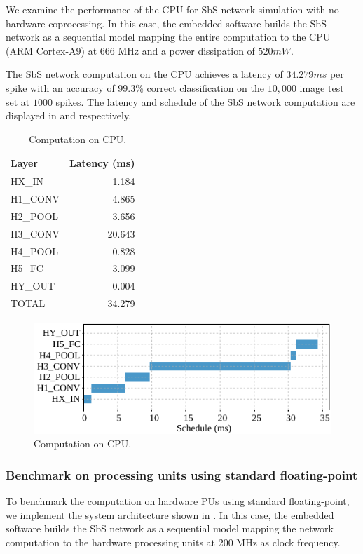 We examine the performance of the CPU for SbS network simulation with no hardware coprocessing. In this case, the embedded software builds the SbS network as a sequential model mapping the entire computation to the CPU (ARM Cortex-A9) at 666 MHz and a power dissipation of $520 mW$.

The SbS network computation on the CPU achieves a latency of $34.279 ms$ per spike with an accuracy of 99.3\% correct classification on the $10,000$ image test set at $1000$ spikes. The latency and schedule of the SbS network computation are displayed in  and  respectively.

\begin{table}[!t]\centering
	\caption{Computation on CPU.}\label{tab:latency_sw}
	\scriptsize
\begin{tabular}{lrr}\toprule
	\textbf{Layer} &\textbf{Latency (ms)} \\\midrule
	HX\_IN &1.184 \\
	H1\_CONV &4.865 \\
	H2\_POOL &3.656 \\
	H3\_CONV &20.643 \\
	H4\_POOL &0.828 \\
	H5\_FC &3.099 \\
	HY\_OUT &0.004 \\
		
	TOTAL &34.279 \\
	\bottomrule
\end{tabular}
\end{table}

\begin{figure}[t!]
	\centering
	\includegraphics[width=1\columnwidth]{../figures/latency_sw.pdf}
	\caption{Computation on CPU.}
	\label{fig:latency_sw}
\end{figure}

\subsubsection{Benchmark on processing units using standard floating-point}
To benchmark the computation on hardware PUs using standard floating-point, we implement the system architecture shown in . In this case, the embedded software builds the SbS network as a sequential model mapping the network computation to the hardware processing units at 200 MHz as clock frequency.

